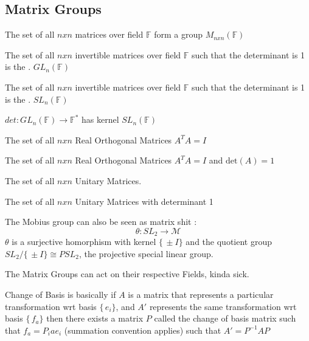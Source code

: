 \documentclass[11pt]{scrartcl}
\newcommand\setp[1]{\{\,#1\}}
\begin{document}
\subsection{Matrix Groups}
\begin{definitions}
The set of all $n x n$ matrices over field $\mathbb{F}$ form a group $M_{nxn}(\mathbb{F})$
\end{definitions}
\begin{definitions}
The set of all $nxn$ invertible matrices over field $\mathbb{F}$ such that the determinant is 1 is the . $GL_n(\mathbb{F})$ 
\end{definitions}
\begin{definitions}
The set of all $nxn$ invertible matrices over field $\mathbb{F}$ such that the determinant is 1 is the . $SL_n(\mathbb{F})$
\end{definitions}
\begin{prop}
$det : GL_n(\mathbb{F}) \rightarrow \mathbb{F}^{*} $ has kernel $SL_n(\mathbb{F})$
\end{prop}
\begin{definitions}
The set of all $nxn$ Real Orthogonal Matrices $A^T A =I$
\end{definitions}
\begin{definitions}
The set of all $nxn$ Real Orthogonal Matrices $A^T A =I$ and $\text{det}(A)=1$
\end{definitions}
\begin{definitions}
The set of all $nxn$ Unitary Matrices.
\end{definitions}
\begin{definitions}
The set of all $nxn$ Unitary Matrices with determinant 1
\end{definitions}
\begin{prop}
The Mobius group can also be seen as matrix shit :
$$\theta : SL_{2} \to \mathcal{M}$$
$\theta$ is a surjective homorphism with kernel $\setp{\pm I}$ and the quotient group $SL_{2}/\setp{\pm I} \cong PSL_2$, the projective special linear group. 
\end{prop}
\begin{prop}
The Matrix Groups can act on their respective Fields, kinda sick.
\end{prop}
\begin{prop}
Change of Basis is basically if $A$ is a matrix that represents a particular transformation wrt basis $\setp{e_i}$, and $A'$ represents the same transformation wrt basis $\setp{f_a}$ then there exists a matrix $P$ called the change of basis matrix such that $f_a=P_ia e_i$ (summation convention applies) such that $A'=P^{-1}AP$
\end{prop}
\end{document}
